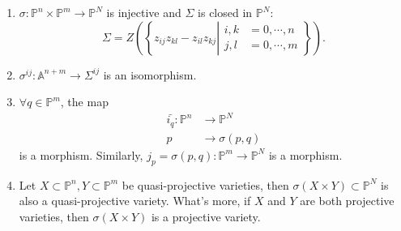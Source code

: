 \begin{theorem}{}
  \noindent
	\begin{enumerate}
		\item $ \sigma:\mathbb{P}^n\times\mathbb{P}^m\to \mathbb{P}^N $ is injective and $ \Sigma $ is closed in $ \mathbb{P}^N $:
		      \begin{equation}\label{17}
			      \Sigma=Z\left(\left\lbrace z_{ij}z_{kl}-z_{il}z_{kj}\left|\begin{matrix}
				      i,k & =0,\cdots,n \\
				      j,l & =0,\cdots,m
			      \end{matrix} \right.\right\rbrace\right).
		      \end{equation}
		\item $ \sigma^{ij}:\mathbb{A}^{n+m}\to \Sigma^{ij} $ is an isomorphism.
		\item $ \forall q\in\mathbb{P}^m $, the map
		      $$\begin{array}{cc}
				      \bar{i_q}:  \mathbb{P}^n & \to \mathbb{P}^N \\
				      p                        & \to \sigma(p,q)
			      \end{array}$$
		      is a morphism. Similarly, $ j_p=\sigma(p,q):\mathbb{P}^m\to \mathbb{P}^N $ is a morphism.
		\item Let $ X\subset \mathbb{P}^n,Y\subset \mathbb{P}^m $ be quasi-projective varieties, then $ \sigma(X\times Y)\subset \mathbb{P}^N $ is also a quasi-projective variety. What's more, if $ X $ and $ Y $ are both projective varieties, then $ \sigma(X\times Y) $ is a projective variety.
	\end{enumerate}
\end{theorem}
